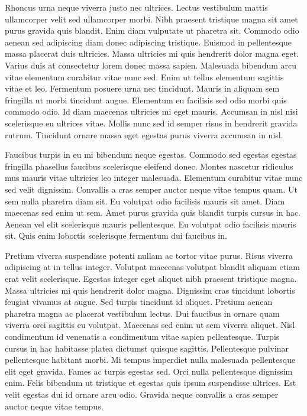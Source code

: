 \documentclass[11pt,a4paper]{article}
\begin{document}
Rhoncus urna neque viverra justo nec ultrices. Lectus vestibulum mattis ullamcorper velit sed ullamcorper morbi. Nibh praesent tristique magna sit amet purus gravida quis blandit. Enim diam vulputate ut pharetra sit. Commodo odio aenean sed adipiscing diam donec adipiscing tristique. Euismod in pellentesque massa placerat duis ultricies. Massa ultricies mi quis hendrerit dolor magna eget. Varius duis at consectetur lorem donec massa sapien. Malesuada bibendum arcu vitae elementum curabitur vitae nunc sed. Enim ut tellus elementum sagittis vitae et leo. Fermentum posuere urna nec tincidunt. Mauris in aliquam sem fringilla ut morbi tincidunt augue. Elementum eu facilisis sed odio morbi quis commodo odio. Id diam maecenas ultricies mi eget mauris. Accumsan in nisl nisi scelerisque eu ultrices vitae. Mollis nunc sed id semper risus in hendrerit gravida rutrum. Tincidunt ornare massa eget egestas purus viverra accumsan in nisl.

Faucibus turpis in eu mi bibendum neque egestas. Commodo sed egestas egestas fringilla phasellus faucibus scelerisque eleifend donec. Montes nascetur ridiculus mus mauris vitae ultricies leo integer malesuada. Elementum curabitur vitae nunc sed velit dignissim. Convallis a cras semper auctor neque vitae tempus quam. Ut sem nulla pharetra diam sit. Eu volutpat odio facilisis mauris sit amet. Diam maecenas sed enim ut sem. Amet purus gravida quis blandit turpis cursus in hac. Aenean vel elit scelerisque mauris pellentesque. Eu volutpat odio facilisis mauris sit. Quis enim lobortis scelerisque fermentum dui faucibus in.

Pretium viverra suspendisse potenti nullam ac tortor vitae purus. Risus viverra adipiscing at in tellus integer. Volutpat maecenas volutpat blandit aliquam etiam erat velit scelerisque. Egestas integer eget aliquet nibh praesent tristique magna. Massa ultricies mi quis hendrerit dolor magna. Dignissim cras tincidunt lobortis feugiat vivamus at augue. Sed turpis tincidunt id aliquet. Pretium aenean pharetra magna ac placerat vestibulum lectus. Dui faucibus in ornare quam viverra orci sagittis eu volutpat. Maecenas sed enim ut sem viverra aliquet. Nisl condimentum id venenatis a condimentum vitae sapien pellentesque. Turpis cursus in hac habitasse platea dictumst quisque sagittis. Pellentesque pulvinar pellentesque habitant morbi. Mi tempus imperdiet nulla malesuada pellentesque elit eget gravida. Fames ac turpis egestas sed. Orci nulla pellentesque dignissim enim. Felis bibendum ut tristique et egestas quis ipsum suspendisse ultrices. Est velit egestas dui id ornare arcu odio. Gravida neque convallis a cras semper auctor neque vitae tempus.
\end{document}
